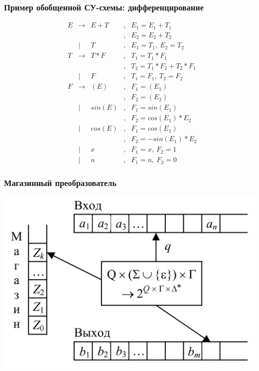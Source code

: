 \documentclass{beamer}
\begin{document}
\begin{frame}[fragile]
  \transwipe[direction=90]
  \frametitle{Пример обобщенной СУ-схемы: дифференцирование}
$$
\begin{array}{ccclcl}
&E& \rightarrow & E + T &,& E_1 = E_1 + T_1 \\
& &             &       &,& E_2 = E_2 + T_2 \\
& &      |      &     T &,& E_1 = T_1, \ E_2 = T_2  \\

&T& \rightarrow & T * F &,& T_1 = T_1 * F_1 \\
& &             &       &,& T_2 = T_1 * F_2 + T_2 * F_1\\
& &      |      &     F &,& T_1 = F_1, \ T_2 = F_2 \\

&F& \rightarrow & ( E ) &,& F_1 = (E_1) \\
& &             &       &,& F_2 = (E_2) \\
& &      |      & sin(E)&,& F_1 = sin(E_1) \\
& &             &       &,& F_2 = cos(E_1) * E_2 \\
& &      |      & cos(E)&,& F_1 = cos(E_1) \\
& &             &       &,& F_2 = -sin(E_1) * E_2 \\
& &      |      &    x  &,& F_1 = x, \ F_2 = 1 \\
& &      |      &    n  &,& F_1 = n, \ F_2 = 0
\end{array}
$$
\end{frame}


\begin{frame}[fragile]
  \transwipe[direction=90]
  \frametitle{Магазинный преобразователь}
\begin{center}
  \includegraphics[width=\textwidth]{pics/transducer.png}
\end{center}

\end{frame}
\end{document}

